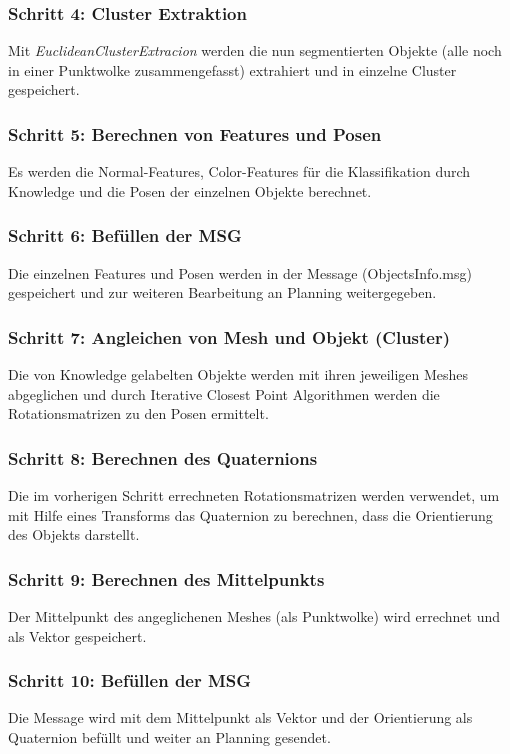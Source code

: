 \documentclass{suturo}
\begin{document}
\subsubsection{Schritt 4: Cluster Extraktion}
Mit \textit{EuclideanClusterExtracion} werden die nun segmentierten Objekte (alle noch in einer Punktwolke zusammengefasst) extrahiert und in einzelne Cluster gespeichert.
\\
\subsubsection{Schritt 5: Berechnen von Features und Posen}
Es werden die Normal-Features, Color-Features für die Klassifikation durch Knowledge und die Posen der einzelnen Objekte berechnet.
 
\subsubsection{Schritt 6: Befüllen der MSG}
Die einzelnen Features und Posen werden in der Message (ObjectsInfo.msg) gespeichert und zur weiteren Bearbeitung an Planning weitergegeben.

\subsubsection{Schritt 7: Angleichen von Mesh und Objekt (Cluster)}
Die von Knowledge gelabelten Objekte werden mit ihren jeweiligen Meshes abgeglichen und durch Iterative Closest Point Algorithmen werden die Rotationsmatrizen zu den Posen ermittelt.

\subsubsection{Schritt 8: Berechnen des Quaternions }
Die im vorherigen Schritt errechneten Rotationsmatrizen werden verwendet, um mit Hilfe eines Transforms das Quaternion zu berechnen, dass die Orientierung des Objekts darstellt. 

\subsubsection{Schritt 9: Berechnen des Mittelpunkts }
Der Mittelpunkt des angeglichenen Meshes (als Punktwolke) wird errechnet und als Vektor gespeichert.
\\
\subsubsection{Schritt 10: Befüllen der MSG }
Die Message wird mit dem Mittelpunkt als Vektor und der Orientierung als Quaternion befüllt und weiter an Planning gesendet.
\end{document}
